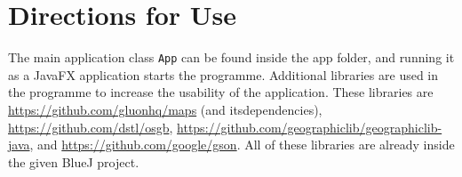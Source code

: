 \documentclass[../main.tex]{subfiles}
\begin{document}
\section{Directions for Use}

\noindent The main application class \verb|App| can be found inside the app folder, and running it as a JavaFX application
starts the programme. Additional libraries are used in the programme to increase the usability of the application.
These libraries are \href{Gluon Maps}{https://github.com/gluonhq/maps} (and itsdependencies),
\href{OSGB}{https://github.com/dstl/osgb}, \href{GeographicLib}{https://github.com/geographiclib/geographiclib-java},
and \href{Gson}{https://github.com/google/gson}.
All of these libraries are already inside the given BlueJ project.
\end{document}
